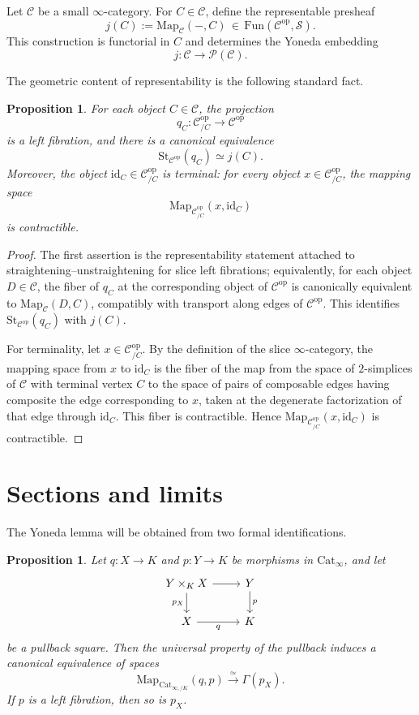 \documentclass[11pt]{article}
\newtheorem{proposition}[theorem]{Proposition}
\theoremstyle{definition}
\newcommand{\C}{\mathcal{C}}
\newcommand{\Sps}{\mathcal{S}}
\newcommand{\PSh}{\mathcal{P}(\mathcal{C})}
\newcommand{\Fun}{\mathrm{Fun}}
\newcommand{\Map}{\mathrm{Map}}
\newcommand{\St}{\mathrm{St}}
\newcommand{\id}{\mathrm{id}}
\newcommand{\op}{\mathrm{op}}
\begin{document}
Let $\C$ be a small $\infty$-category. For $C \in \C$, define the representable
presheaf
\[
  j(C) := \Map_{\C}(-,C) \,\in \, \Fun(\C^{\op},\Sps).
\]
This construction is functorial in $C$ and determines the Yoneda embedding
\[
  j \colon \C \to \PSh.
\]

The geometric content of representability is the following standard fact.

\begin{proposition}\label{prop:representable}
For each object $C \in \C$, the projection
\[
  q_C \colon \C^{\op}_{/C} \to \C^{\op}
\]
is a left fibration, and there is a canonical equivalence
\[
  \St_{\C^{\op}}(q_C) \simeq j(C).
\]
Moreover, the object $\id_C \in \C^{\op}_{/C}$ is terminal: for every object
$x \in \C^{\op}_{/C}$, the mapping space
\[
  \Map_{\C^{\op}_{/C}}(x,\id_C)
\]
is contractible.
\end{proposition}

\begin{proof}
The first assertion is the representability statement attached to
straightening--unstraightening for slice left fibrations; equivalently, for each
object $D \in \C$, the fiber of $q_C$ at the corresponding object of $\C^{\op}$ is
canonically equivalent to $\Map_{\C}(D,C)$, compatibly with transport along edges
of $\C^{\op}$. This identifies $\St_{\C^{\op}}(q_C)$ with $j(C)$.

For terminality, let $x \in \C^{\op}_{/C}$. By the definition of the slice
$\infty$-category, the mapping space from $x$ to $\id_C$ is the fiber of the map
from the space of $2$-simplices of $\C$ with terminal vertex $C$ to the space of
pairs of composable edges having composite the edge corresponding to $x$, taken at
the degenerate factorization of that edge through $\id_C$. This fiber is
contractible. Hence $\Map_{\C^{\op}_{/C}}(x,\id_C)$ is contractible.
\end{proof}

\section{Sections and limits}

The Yoneda lemma will be obtained from two formal identifications.

\begin{proposition}\label{prop:sections-pullback}
Let $q \colon X \to K$ and $p \colon Y \to K$ be morphisms in $\mathrm{Cat}_{\infty}$, and
let
\[
\begin{tikzcd}
Y \times_K X \arrow[r] \arrow[d, "p_X"'] & Y \arrow[d, "p"] \\
X \arrow[r, "q"'] & K
\end{tikzcd}
\]
be a pullback square. Then the universal property of the pullback induces a
canonical equivalence of spaces
\[
  \Map_{\mathrm{Cat}_{\infty,/K}}(q,p) \xrightarrow{\simeq} \Gamma(p_X).
\]
If $p$ is a left fibration, then so is $p_X$.
\end{proposition}
\end{document}
